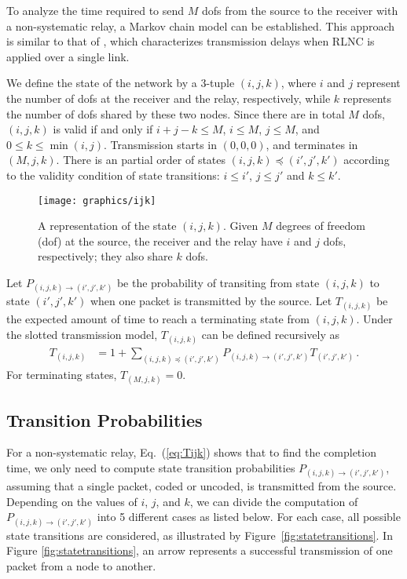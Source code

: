 To analyze the time required to send $M$ dofs from the source to the receiver with a non-systematic relay, a Markov chain model can be established. This approach is similar to that of \cite{lucani_fieldsize}, which characterizes transmission delays when RLNC is applied over a single link.

We define the state of the network by a 3-tuple $(i,j,k)$, where $i$ and $j$ represent the number of dofs at the receiver and the relay, respectively, while $k$ represents the number of dofs shared by these two nodes. Since there are in total $M$ dofs, $(i,j,k)$ is valid if and only if $i+j-k \leq M$, $i\leq M$, $j\leq M$, and $ 0 \leq k \leq \min(i,j)$. Transmission starts in $(0,0,0)$, and terminates in $(M,j,k)$. There is an partial order of states $(i,j,k) \preceq (i',j',k')$ according to the validity condition of state transitions: $i\leq i'$, $j\leq j'$ and $k\leq k'$.

\begin{figure}[t!]
\centering
\texttt{[image: graphics/ijk]}
\caption{A representation of the state $(i,j,k)$. Given $M$ degrees of freedom (dof) at the source, the receiver and the relay have $i$ and $j$ dofs, respectively; they also share $k$ dofs.}\vspace*{-.3cm}
\label{fig:state}
\end{figure}

Let $P_{(i,j,k) \rightarrow (i',j',k')}$ be the probability of transiting from state $(i,j,k)$ to state $(i',j',k')$ when one packet is transmitted by the source. Let $T_{(i,j,k)}$ be the expected amount of time to reach a terminating state from $(i,j,k)$. Under the slotted transmission model, $T_{(i,j,k)}$ can be defined recursively as
\begin{align}
T_{(i,j,k)} & = 1 +\sum_{(i,j,k) \preceq (i',j',k')}P_{(i,j,k) \rightarrow (i',j',k')} T_{(i',j',k')}\,. \label{eq:Tijk}
\end{align}
For terminating states, $T_{(M,j,k)}=0$.


\subsection{Transition Probabilities}

For a non-systematic relay, Eq.~(\ref{eq:Tijk}) shows that to find the completion time, we only need to compute state transition probabilities $P_{(i,j,k) \rightarrow (i',j',k')}$, assuming that a single packet, coded or uncoded, is transmitted from the source. Depending on the values of $i$, $j$, and $k$, we can divide the computation of $P_{(i,j,k) \rightarrow (i',j',k')}$ into 5 different cases as listed below. For each case, all possible state transitions are considered, as illustrated by Figure~\ref{fig:statetransitions}. In Figure \ref{fig:statetransitions}, an arrow represents a successful transmission of one packet from a node to another. 


